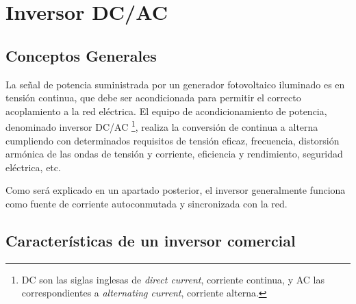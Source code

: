 \section{Inversor DC/AC}
\label{InversorSFCR}

\subsection{Conceptos Generales}

La señal de potencia suministrada por un generador fotovoltaico iluminado
es en tensión continua, que debe ser acondicionada para permitir el
correcto acoplamiento a la red eléctrica. El equipo de acondicionamiento
de potencia, denominado inversor DC/AC%
\footnote{DC son las siglas inglesas de \emph{direct current}, corriente continua,
y AC las correspondientes a \emph{alternating current}, corriente
alterna.%
}, realiza la conversión de continua a alterna cumpliendo con determinados
requisitos de tensión eficaz, frecuencia, distorsión armónica de las
ondas de tensión y corriente, eficiencia y rendimiento, seguridad
eléctrica, etc. 

Como será explicado en un apartado posterior, el inversor generalmente
funciona como fuente de corriente autoconmutada y sincronizada con
la red.


\subsection{Características de un inversor comercial}

